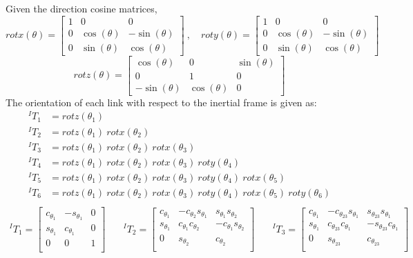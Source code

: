 Given the direction cosine matrices,
\[
rotx(\theta) = \begin{bmatrix}
 1 & 0 & 0\\
 0 & \cos(\theta) & -\sin(\theta) \\
 0 & \sin(\theta) & \cos(\theta)
\end{bmatrix}~,\quad
roty(\theta) = \begin{bmatrix}
 1 & 0 & 0\\
 0 & \cos(\theta) & -\sin(\theta) \\
 0 & \sin(\theta) & \cos(\theta)
\end{bmatrix}
\]
\[
rotz(\theta) = \begin{bmatrix}
 \cos(\theta) & 0 & \sin(\theta)\\
  0 & 1 & 0 \\
 -\sin(\theta) & \cos(\theta) & 0
\end{bmatrix}
\]
The orientation of each link with respect to the inertial frame is given as:
\[
\begin{aligned}
^IT_1 &= rotz(\theta_1) \\
^IT_2 &= rotz(\theta_1)~rotx(\theta_2)\\
^IT_3 &= rotz(\theta_1)~rotx(\theta_2)~rotx(\theta_3)\\
^IT_4 &= rotz(\theta_1)~rotx(\theta_2)~rotx(\theta_3)~roty(\theta_4)\\
^IT_5 &= rotz(\theta_1)~rotx(\theta_2)~rotx(\theta_3)~roty(\theta_4)~rotx(\theta_5)\\
^IT_6 &= rotz(\theta_1)~rotx(\theta_2)~rotx(\theta_3)~roty(\theta_4)~rotx(\theta_5)~roty(\theta_6)\\
\end{aligned}
\]
\[
\begin{aligned}
  ^IT_1 =
  \begin{bmatrix}
    c_{\theta_1}& -s_{\theta_1}& 0\\
    s_{\theta_1}&  c_{\theta_1}& 0\\
    0&            0& 1\\
  \end{bmatrix} & \quad
  ^IT_2 =
  \begin{bmatrix}
    c_{\theta_1}& -c_{\theta_2}s_{\theta_1}&  s_{\theta_1}s_{\theta_2}\\
    s_{\theta_1}&  c_{\theta_1}c_{\theta_2}& -c_{\theta_1}s_{\theta_2}\\
    0&              s_{\theta_2}&              c_{\theta_2}\\
  \end{bmatrix} & \quad
  ^IT_3 =
  \begin{bmatrix}
    c_{\theta_1}& -c_{\theta_{23}}s_{\theta_1}&  s_{\theta_{23}}s_{\theta_1}\\
    s_{\theta_1}&  c_{\theta_{23}}c_{\theta_1}& -s_{\theta_{23}}c_{\theta_1}\\
    0&              s_{\theta_{23}}&              c_{\theta_{23}}\\
  \end{bmatrix}
\end{aligned}
\]
